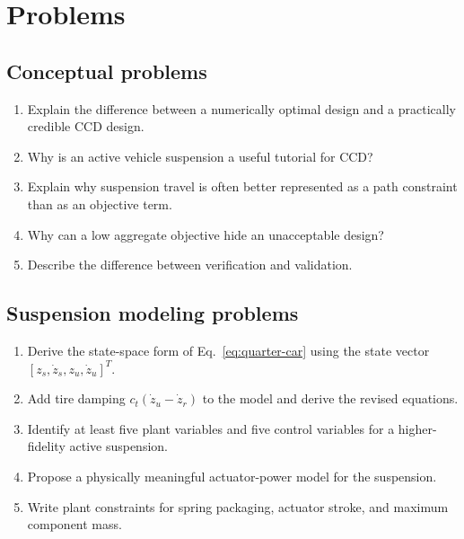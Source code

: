 \documentclass[11pt]{article}
\begin{document}
\section{Problems}

\subsection*{Conceptual problems}
\begin{enumerate}[leftmargin=1.5em,label=\textbf{P\arabic*.}]
  \item Explain the difference between a numerically optimal design and a practically credible CCD design.
  \item Why is an active vehicle suspension a useful tutorial for CCD?
  \item Explain why suspension travel is often better represented as a path constraint than as an objective term.
  \item Why can a low aggregate objective hide an unacceptable design?
  \item Describe the difference between verification and validation.
\end{enumerate}

\subsection*{Suspension modeling problems}
\begin{enumerate}[leftmargin=1.5em,label=\textbf{P\arabic*.},resume]
  \item Derive the state-space form of Eq.~\eqref{eq:quarter-car} using the state vector $[z_s,\dot z_s,z_u,\dot z_u]^T$.
  \item Add tire damping $c_t(\dot z_u-\dot z_r)$ to the model and derive the revised equations.
  \item Identify at least five plant variables and five control variables for a higher-fidelity active suspension.
  \item Propose a physically meaningful actuator-power model for the suspension.
  \item Write plant constraints for spring packaging, actuator stroke, and maximum component mass.
\end{enumerate}
\end{document}

